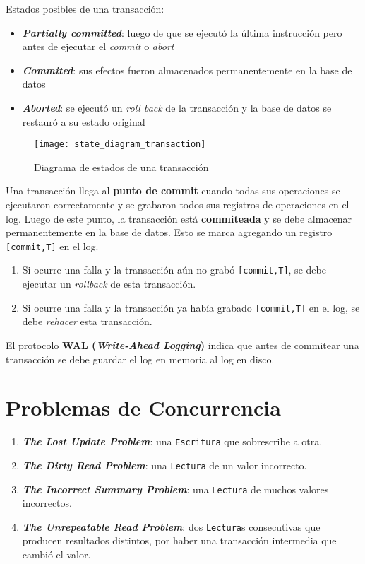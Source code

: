 \documentclass[a4paper, twoside]{article}
\begin{document}
Estados posibles de una transacción:
\begin{itemize}
	\item \textbf{\emph{Partially committed}}: luego de que se ejecutó la última instrucción pero antes de ejecutar el \emph{commit} o \emph{abort}
	\item \textbf{\emph{Commited}}: sus efectos fueron almacenados permanentemente en la base de datos
	\item \textbf{\emph{Aborted}}: se ejecutó un \emph{roll back} de la transacción y la base de datos se restauró a su estado original
\end{itemize}

\begin{figure}[H]
	\centering
	\texttt{[image: state\_diagram\_transaction]}
	\caption{Diagrama de estados de una transacción}
\end{figure}

Una transacción llega al \textbf{punto de commit} cuando todas sus operaciones se ejecutaron correctamente y se grabaron todos sus registros de operaciones en el log. Luego de este punto, la transacción está \textbf{commiteada} y se debe almacenar permanentemente en la base de datos. Esto se marca agregando un registro \texttt{[commit,T]} en el log.
\begin{enumerate}
	\item Si ocurre una falla y la transacción aún no grabó \texttt{[commit,T]}, se debe ejecutar un \emph{rollback} de esta transacción.
	\item Si ocurre una falla y la transacción ya había grabado \texttt{[commit,T]} en el log, se debe \emph{rehacer} esta transacción.
\end{enumerate}

El protocolo \textbf{WAL (\emph{Write-Ahead Logging})} indica que antes de commitear una transacción se debe guardar el log en memoria al log en disco.

\section{Problemas de Concurrencia}
\begin{enumerate}
	\item \textbf{\emph{The Lost Update Problem}}: una \texttt{Escritura} que sobrescribe a otra.
	\item \textbf{\emph{The Dirty Read Problem}}: una \texttt{Lectura} de un valor incorrecto.
	\item \textbf{\emph{The Incorrect Summary Problem}}: una \texttt{Lectura} de muchos valores incorrectos.
	\item \textbf{\emph{The Unrepeatable Read Problem}}: dos \texttt{Lectura}s consecutivas que producen resultados distintos, por haber una transacción intermedia que cambió el valor.
\end{enumerate}
\end{document}
